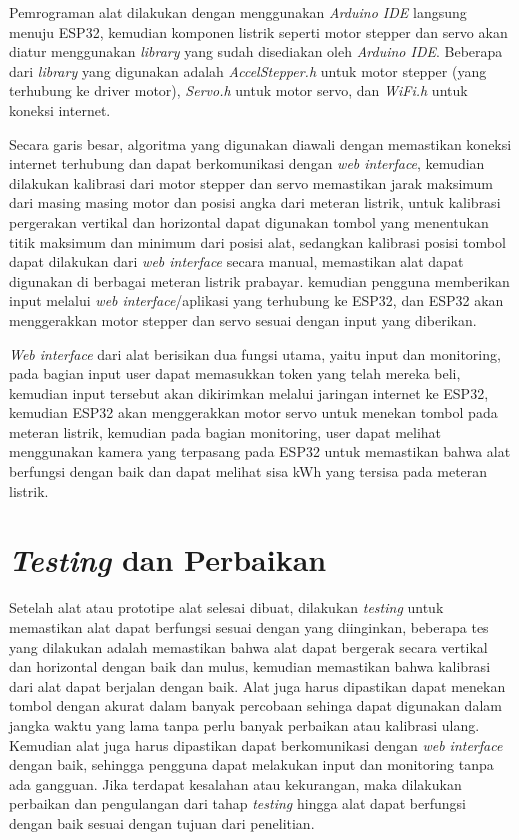 Pemrograman alat dilakukan dengan menggunakan \textit{Arduino IDE} langsung menuju ESP32, kemudian komponen listrik
seperti motor stepper dan servo akan diatur menggunakan \textit{library} yang sudah disediakan oleh \textit{Arduino IDE}.
Beberapa dari \textit{library} yang digunakan adalah \textit{AccelStepper.h} untuk motor stepper (yang terhubung ke driver motor), 
\textit{Servo.h} untuk motor servo, dan \textit{WiFi.h} untuk koneksi internet. 

Secara garis besar,
algoritma yang digunakan diawali dengan memastikan koneksi internet terhubung dan dapat berkomunikasi dengan
\textit{web interface}, kemudian dilakukan
kalibrasi dari motor stepper dan servo memastikan jarak maksimum dari masing masing motor dan posisi
angka dari meteran listrik, untuk kalibrasi pergerakan vertikal dan horizontal dapat digunakan tombol yang menentukan titik
maksimum dan minimum dari posisi alat, sedangkan kalibrasi posisi tombol dapat dilakukan dari \textit{web interface} secara manual,
memastikan alat dapat digunakan di berbagai meteran listrik prabayar.
kemudian pengguna memberikan input melalui \textit{web interface}/aplikasi yang terhubung ke ESP32,
dan ESP32 akan menggerakkan motor stepper dan servo sesuai dengan input yang diberikan.

\textit{Web interface} dari alat berisikan dua fungsi utama, yaitu input dan monitoring, pada bagian input user dapat memasukkan
token yang telah mereka beli, kemudian input tersebut akan dikirimkan melalui jaringan internet ke ESP32, kemudian ESP32 akan
menggerakkan motor servo untuk menekan tombol pada meteran listrik, kemudian pada bagian monitoring, user dapat melihat menggunakan
kamera yang terpasang pada ESP32 untuk memastikan bahwa alat berfungsi dengan baik dan dapat melihat sisa kWh yang tersisa pada meteran listrik.

\section{\textit{Testing} dan Perbaikan}

Setelah alat atau prototipe alat selesai dibuat, dilakukan \textit{testing} untuk memastikan alat dapat berfungsi sesuai dengan
yang diinginkan, beberapa tes yang dilakukan adalah memastikan bahwa alat dapat bergerak secara vertikal dan horizontal dengan baik
dan mulus, kemudian memastikan bahwa kalibrasi dari alat dapat berjalan dengan baik. Alat juga harus dipastikan dapat menekan tombol
dengan akurat dalam banyak percobaan sehinga dapat digunakan dalam jangka waktu yang lama tanpa perlu banyak perbaikan atau kalibrasi ulang.
Kemudian alat juga harus dipastikan dapat berkomunikasi dengan \textit{web interface} dengan baik, sehingga pengguna dapat melakukan
input dan monitoring tanpa ada gangguan. Jika terdapat kesalahan atau kekurangan, maka dilakukan perbaikan dan pengulangan dari tahap
\textit{testing} hingga alat dapat berfungsi dengan baik sesuai dengan tujuan dari penelitian.
